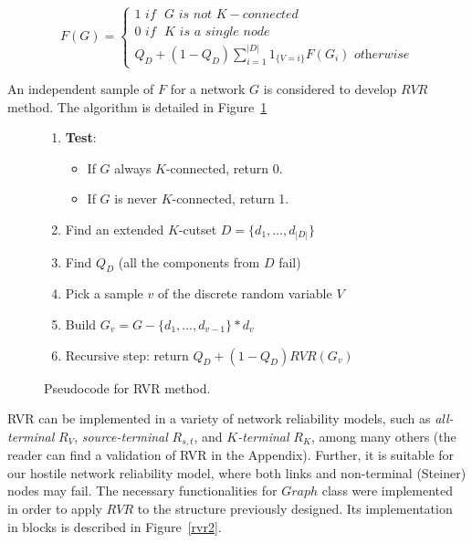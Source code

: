 \[
    F(G)=\left\{
                \begin{array}{lll}
1 \, \, \textit{if } \, \, G  \, \, \textit{is not} \, \, K-\textit{connected}\\
0 \, \,  \textit{if } \, \, K  \, \, \textit{is a single node}\\
Q_D+(1-Q_D)\sum_{i=1}^{|D|}1_{\{V=i\}}F(G_i) \, \, \textit{otherwise}
                \end{array}
              \right.
  \]

An independent sample of $F$ for a network $G$ is considered to develop $RVR$ method. The algorithm is detailed in Figure~\ref{rvr}
\begin{figure}[H]
\begin{algorithm}[H]
\caption{$RVR(G,K,p_v,p_e)$} %
\begin{enumerate}
\item \textbf{Test}: 
             \begin{itemize}
             \item If $G$ always $K$-connected, return 0.
             \item If $G$ is never $K$-connected, return 1.
             \end{itemize} 
\item Find an extended $K$-cutset $D=\{d_1,\ldots,d_{|D|}\}$
\item Find $Q_D$ (all the components from $D$ fail)
\item Pick a sample $v$ of the discrete random variable $V$
\item Build $G_v = G-\{d_1,\ldots,d_{v-1}\}*d_v$
\item Recursive step: return $Q_D+(1-Q_D)RVR(G_v)$
\end{enumerate}
\end{algorithm}
\caption{Pseudocode for RVR method. \label{rvr}}
\end{figure}


RVR can be implemented in a variety of network reliability models, such as \emph{all-terminal} $R_V$, \emph{source-terminal} $R_{s,t}$, and \emph{$K$-terminal} $R_{K}$, 
among many others (the reader can find a validation of RVR in the Appendix). Further, it is suitable for 
our hostile network reliability model, where both links and non-terminal (Steiner) nodes may fail. 
The necessary functionalities for $Graph$ class were implemented in order to apply 
 $RVR$ to the structure previously designed. Its implementation in blocks is described in Figure~\ref{rvr2}.
 
